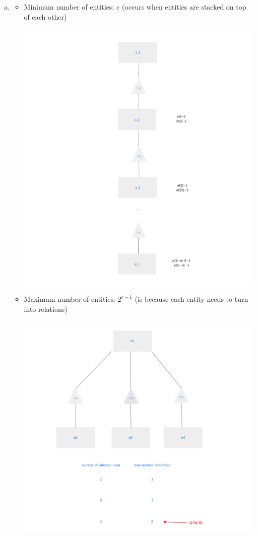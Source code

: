 \documentclass[12pt]{article}
\begin{document}
\begin{enumerate}[1.]
\begin{enumerate}[a)]
        \item

        \begin{itemize}
            \item Minimum number of entities: $e$ (occurs when entities are stacked on top of each other)

            \begin{center}
            \includegraphics[width=0.7\linewidth]{images/worksheet_14_solution_79.png}
            \end{center}

            \item Maximum number of entities: $2^{e-1}$ (is because each entity needs to turn into relations)

            \begin{center}
            \includegraphics[width=0.7\linewidth]{images/worksheet_14_solution_80.png}
            \end{center}


\end{itemize}
\end{enumerate}
\end{enumerate}
\end{document}
